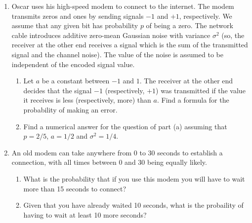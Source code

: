 \documentclass[paper=usletter, fontsize=12pt]{article}
\begin{document}
\begin{enumerate}
        \item Oscar uses his high-speed modem to connect to the internet. The
        modem transmits zeros and ones by sending signals $-1$ and $+1$,
        respectively. We assume that any given bit has probability $p$ of being
        a zero. The network cable introduces additive zero-mean Gaussian noise
        with variance $\sigma^2$ (so, the receiver at the other end receives a
        signal which is the sum of the transmitted signal and the channel
        noise). The value of the noise is assumed to be independent of the
        encoded signal value.
        \begin{enumerate}

            \item Let $a$ be a constant between $-1$ and $1$.
            The receiver at the other end decides that the signal $-1$
            (respectively, $+1$) was transmitted if the value it receives is
            less (respectively, more) than $a$. Find a formula for the
            probability of making an error.
            \begin{cproof}
            \end{cproof}

            \item Find a numerical answer for the question of part (a) assuming
            that $p=2/5$, $a=1/2$ and $\sigma^2=1/4$.
            \begin{cproof}
            \end{cproof}

        \end{enumerate}

        \item An old modem can take anywhere from 0 to 30 seconds to establish
        a connection, with all times between 0 and 30 being equally likely.
        \begin{enumerate}

            \item What is the probability that if you use this modem you will
            have to wait more than 15 seconds to connect?
            \begin{cproof}
            \end{cproof}

            \item Given that you have already waited 10 seconds, what is the
            probaility of having to wait at least 10 more seconds?
            \begin{cproof}
            \end{cproof}


\end{enumerate}
\end{enumerate}
\end{document}
